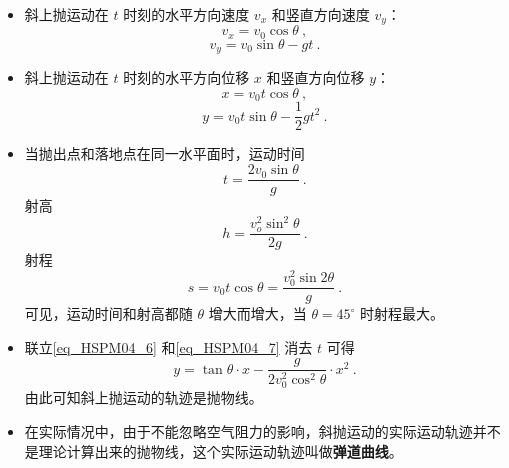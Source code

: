 \begin{itemize}
\item 斜上抛运动在 $t$ 时刻的水平方向速度 $v_x$ 和竖直方向速度 $v_y$：
\begin{equation}
v_x=v_0\cos\theta~,
\end{equation}
\begin{equation}
v_y=v_0\sin\theta-gt~.
\end{equation}

\item 斜上抛运动在 $t$ 时刻的水平方向位移 $x$ 和竖直方向位移 $y$：
\begin{equation}\label{eq_HSPM04_6}
x=v_0t\cos\theta~,
\end{equation}
\begin{equation}\label{eq_HSPM04_7}
y= v_0t\sin\theta-\frac12 gt^2~.
\end{equation}

\item 当抛出点和落地点在同一水平面时，运动时间
\begin{equation}
t=\frac{2v_0\sin\theta}{g}~.
\end{equation}
射高
\begin{equation}
h=\frac{v_o^2\sin^2\theta}{2g}~.
\end{equation}
射程
\begin{equation}
s=v_0t\cos\theta=\frac{v_0^2\sin{2\theta}}{g}~.
\end{equation}
可见，运动时间和射高都随 $\theta$ 增大而增大，当 $\theta=45^\circ$ 时射程最大。

\item 联立\autoref{eq_HSPM04_6} 和\autoref{eq_HSPM04_7} 消去 $t$ 可得
\begin{equation}
y=\tan\theta\cdot x-\frac{g}{2v_0^2\cos^2\theta}\cdot x^2~.
\end{equation}
由此可知斜上抛运动的轨迹是抛物线。

\item 在实际情况中，由于不能忽略空气阻力的影响，斜抛运动的实际运动轨迹并不是理论计算出来的抛物线，这个实际运动轨迹叫做\textbf{弹道曲线}。
\end{itemize}
